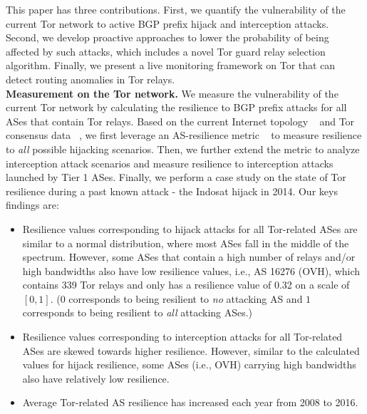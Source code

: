 This paper has three contributions. First, we quantify the vulnerability of the current Tor network to active BGP prefix hijack and interception attacks. Second, we develop proactive approaches to lower the probability of being affected by such attacks, which includes a novel Tor guard relay selection algorithm. Finally, we present a live monitoring framework on Tor that can detect routing anomalies in Tor relays. 
\\
\textbf{Measurement on the Tor network.} We measure the vulnerability of the current Tor network by calculating the resilience to BGP prefix attacks for all ASes that contain Tor relays. Based on the current Internet topology ~\cite{topology} and Tor consensus data ~\cite{torconsensus}, we first leverage an AS-resilience metric ~\cite{lad2007understanding} to measure resilience to \emph{all} possible hijacking scenarios. Then, we further extend the metric to analyze interception attack scenarios and measure resilience to interception attacks launched by Tier 1 ASes. Finally, we perform a case study on the state of Tor resilience during a past known attack - the Indosat hijack in 2014. Our keys findings are:
\begin{itemize}
\item Resilience values corresponding to hijack attacks for all Tor-related ASes are similar to a normal distribution, where most ASes fall in the middle of the spectrum. However, some ASes that contain a high number of relays and/or high bandwidths also have low resilience values, i.e., AS 16276 (OVH), which contains 339 Tor relays and only has a resilience value of 0.32 on a scale of $[0,1]$. ($0$ corresponds to being resilient to \emph{no} attacking AS and $1$ corresponds to being resilient to \emph{all} attacking ASes.)
\item Resilience values corresponding to interception attacks for all Tor-related ASes are skewed towards higher resilience. However, similar to the calculated values for hijack resilience, some ASes (i.e., OVH) carrying high bandwidths also have relatively low resilience. 
\item Average Tor-related AS resilience has increased each year from 2008 to 2016. 
\end{itemize}
